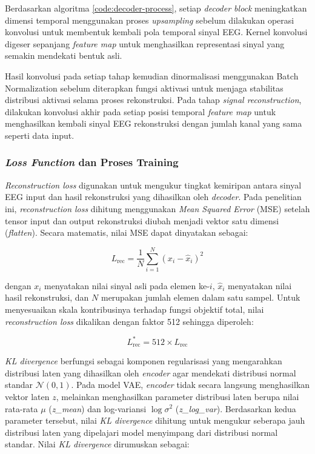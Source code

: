 Berdasarkan algoritma \ref{code:decoder-process}, setiap \textit{decoder block} meningkatkan dimensi temporal menggunakan proses \textit{upsampling} sebelum dilakukan operasi konvolusi untuk membentuk kembali pola temporal sinyal EEG. Kernel konvolusi digeser sepanjang \textit{feature map} untuk menghasilkan representasi sinyal yang semakin mendekati bentuk asli.

Hasil konvolusi pada setiap tahap kemudian dinormalisasi menggunakan Batch Normalization sebelum diterapkan fungsi aktivasi untuk menjaga stabilitas distribusi aktivasi selama proses rekonstruksi. Pada tahap \textit{signal reconstruction}, dilakukan konvolusi akhir pada setiap posisi temporal \textit{feature map} untuk menghasilkan kembali sinyal EEG rekonstruksi dengan jumlah kanal yang sama seperti data input.

\subsubsection{\textit{Loss Function} dan Proses Training}
\label{subsubsec:loss-function-training}
\textit{Reconstruction loss} digunakan untuk mengukur tingkat kemiripan antara sinyal EEG input dan hasil rekonstruksi yang dihasilkan oleh \textit{decoder}. Pada penelitian ini, \textit{reconstruction loss} dihitung menggunakan \textit{Mean Squared Error} (MSE) setelah tensor input dan output rekonstruksi diubah menjadi vektor satu dimensi (\textit{flatten}). Secara matematis, nilai MSE dapat dinyatakan sebagai:

\begin{equation}
L_{\mathrm{rec}} =
\frac{1}{N}
\sum_{i=1}^{N}
(x_i-\hat{x}_i)^2
\end{equation}

dengan $x_i$ menyatakan nilai sinyal asli pada elemen ke-$i$, $\hat{x}_i$ menyatakan nilai hasil rekonstruksi, dan $N$ merupakan jumlah elemen dalam satu sampel. Untuk menyesuaikan skala kontribusinya terhadap fungsi objektif total, nilai \textit{reconstruction loss} dikalikan dengan faktor 512 sehingga diperoleh:

\begin{equation}
L_{\mathrm{rec}}^{*}=512 \times L_{\mathrm{rec}}
\end{equation}

\textit{KL divergence} berfungsi sebagai komponen regularisasi yang mengarahkan distribusi laten yang dihasilkan oleh \textit{encoder} agar mendekati distribusi normal standar $\mathcal{N}(0,1)$. Pada model VAE, \textit{encoder} tidak secara langsung menghasilkan vektor laten $z$, melainkan menghasilkan parameter distribusi laten berupa nilai rata-rata $\mu$ (\textit{z\_mean}) dan log-variansi $\log \sigma^2$ (\textit{z\_log\_var}). Berdasarkan kedua parameter tersebut, nilai \textit{KL divergence} dihitung untuk mengukur seberapa jauh distribusi laten yang dipelajari model menyimpang dari distribusi normal standar. Nilai \textit{KL divergence} dirumuskan sebagai:


